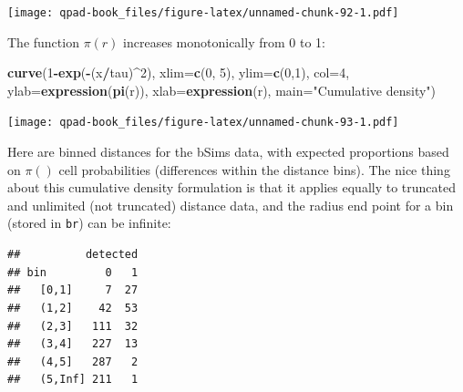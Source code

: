 \documentclass[12pt,]{book}
\newenvironment{Shaded}{\begin{snugshade}}{\end{snugshade}}
\newcommand{\DataTypeTok}[1]{\textcolor[rgb]{0.13,0.29,0.53}{#1}}
\newcommand{\DecValTok}[1]{\textcolor[rgb]{0.00,0.00,0.81}{#1}}
\newcommand{\KeywordTok}[1]{\textcolor[rgb]{0.13,0.29,0.53}{\textbf{#1}}}
\newcommand{\NormalTok}[1]{#1}
\newcommand{\OperatorTok}[1]{\textcolor[rgb]{0.81,0.36,0.00}{\textbf{#1}}}
\newcommand{\OtherTok}[1]{\textcolor[rgb]{0.56,0.35,0.01}{#1}}
\newcommand{\StringTok}[1]{\textcolor[rgb]{0.31,0.60,0.02}{#1}}
\begin{document}
\texttt{[image: qpad-book\_files/figure-latex/unnamed-chunk-92-1.pdf]}

The function \(\pi(r)\) increases monotonically from 0 to 1:

\begin{Shaded}
\begin{Highlighting}[]
\KeywordTok{curve}\NormalTok{(}\DecValTok{1}\OperatorTok{-}\KeywordTok{exp}\NormalTok{(}\OperatorTok{-}\NormalTok{(x}\OperatorTok{/}\NormalTok{tau)}\OperatorTok{^}\DecValTok{2}\NormalTok{), }\DataTypeTok{xlim=}\KeywordTok{c}\NormalTok{(}\DecValTok{0}\NormalTok{, }\DecValTok{5}\NormalTok{), }\DataTypeTok{ylim=}\KeywordTok{c}\NormalTok{(}\DecValTok{0}\NormalTok{,}\DecValTok{1}\NormalTok{), }\DataTypeTok{col=}\DecValTok{4}\NormalTok{,}
  \DataTypeTok{ylab=}\KeywordTok{expression}\NormalTok{(}\KeywordTok{pi}\NormalTok{(r)), }\DataTypeTok{xlab=}\KeywordTok{expression}\NormalTok{(r), }
  \DataTypeTok{main=}\StringTok{"Cumulative density"}\NormalTok{)}
\end{Highlighting}
\end{Shaded}

\texttt{[image: qpad-book\_files/figure-latex/unnamed-chunk-93-1.pdf]}

Here are binned distances for the bSims data, with expected
proportions based on \(\pi()\) cell probabilities
(differences within the distance bins).
The nice thing about this cumulative density formulation
is that it applies equally to truncated and unlimited
(not truncated) distance data, and the radius end point
for a bin (stored in \texttt{br}) can be infinite:

\begin{Shaded}
\end{Shaded}

\begin{verbatim}
##          detected
## bin         0   1
##   [0,1]     7  27
##   (1,2]    42  53
##   (2,3]   111  32
##   (3,4]   227  13
##   (4,5]   287   2
##   (5,Inf] 211   1
\end{verbatim}
\end{document}
